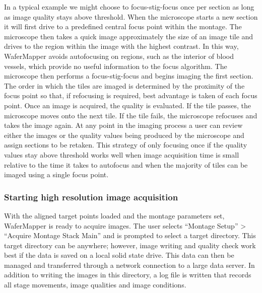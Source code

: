 \documentclass{article}
\begin{document}
In a typical example we might choose to focus-stig-focus once per section as long as image quality stays above threshold. When the microscope starts a new section it will first drive to a predefined central focus point within the montage. The microscope then takes a quick image approximately the size of an image tile and drives to the region within the image with the highest contrast. In this way, WaferMapper avoids autofocusing on regions, such as the interior of blood vessels, which provide no useful information to the focus algorithm. The microscope then performs a focus-stig-focus and begins imaging the first section. The order in which the tiles are imaged is determined by the proximity of the focus point so that, if refocusing is required, best advantage is taken of each focus point. Once an image is acquired, the quality is evaluated. If the tile passes, the microscope moves onto the next tile. If the tile fails, the microscope refocuses and takes the image again. At any point in the imaging process a user can review either the images or the quality values being produced by the microscope and assign sections to be retaken. This strategy of only focusing once if the quality values stay above threshold works well when image acquisition time is small relative to the time it takes to autofocus and when the majority of tiles can be imaged using a single focus point.

\subsubsection*{Starting high resolution image acquisition}

With the aligned target points loaded and the montage parameters set, WaferMapper is ready to acquire images. The user selects “Montage Setup” > “Acquire Montage Stack Main” and is prompted to select a target directory. This target directory can be anywhere; however, image writing and quality check work best if the data is saved on a local solid state drive. This data can then be managed and transferred through a network connection to a large data server. In addition to writing the images in this directory, a log file is written that records all stage movements, image qualities and image conditions.
\end{document}
